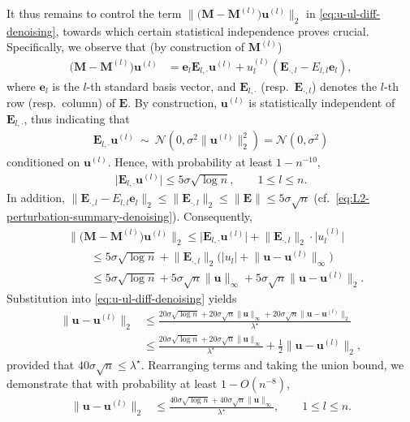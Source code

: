 It thus remains to control the term $\|\big(\bm{M}-\bm{M}^{(l)}\big)\bm{u}^{(l)}\|_{2}$ in \eqref{eq:u-ul-diff-denoising}, towards which certain statistical independence proves crucial. Specifically, we observe that (by construction of $\bm{M}^{(l)}$)
%
\begin{align*}
\big(\bm{M}-\bm{M}^{(l)}\big)\bm{u}^{(l)} & =\bm{e}_{l}\bm{E}_{l,\cdot}\bm{u}^{(l)}+u_{l}^{(l)}(\bm{E}_{\cdot,l} - E_{l,l}\bm{e}_{l}),
\end{align*}
%
where $\bm{e}_{l}$ is the $l$-th standard basis vector,
and $\bm{E}_{l,\cdot}$ (resp.~$\bm{E}_{\cdot,l}$)
denotes the $l$-th row (resp.~column) of $\bm{E}$. By construction, $\bm{u}^{(l)}$ is statistically independent of $\bm{E}_{l,\cdot}$, thus indicating that
%
\begin{align}
	\bm{E}_{l,\cdot} \bm{u}^{(l)} ~\sim~ \mathcal{N}(0, \sigma^2 \|\bm{u}^{(l)}\|_2^2) = \mathcal{N}(0, \sigma^2 )
\end{align}
%
conditioned on $\bm{u}^{(l)}$. Hence, with probability at least $1-n^{-10}$,
%
\begin{align}
	\big| \bm{E}_{l,\cdot} \bm{u}^{(l)} \big| \leq 5\sigma \sqrt{\log n}, \qquad 1\leq l\leq n.
\end{align}
%
In addition, $\|\bm{E}_{\cdot,l} - E_{l,l}\bm{e}_{l}\|_{2} \leq \|\bm{E}_{\cdot,l}\|_2\leq \|\bm{E}\|\leq 5\sigma \sqrt{n}$ (cf.~\eqref{eq:L2-perturbation-summary-denoising}). Consequently,
%
\begin{align*}
 & \|\big(\bm{M}-\bm{M}^{(l)}\big)\bm{u}^{(l)}\|_{2}
	\leq \big|\bm{E}_{l,\cdot}\bm{u}^{(l)}\big|  +
	 \big\|\bm{E}_{\cdot,l}\big\|_{2} \cdot \big|u_{l}^{(l)}\big| \\
 & \qquad \leq5\sigma\sqrt{\log n}+\big\|\bm{E}_{\cdot,l}\big\|_{2}\big(\big|u_{l}\big|+\big\|\bm{u}-\bm{u}^{(l)}\big\|_{\infty}\big)\\
 & \qquad \leq5\sigma\sqrt{\log n}+5\sigma\sqrt{n}\|\bm{u}\|_{\infty}+5\sigma\sqrt{n}\big\|\bm{u}-\bm{u}^{(l)}\big\|_{2}.
\end{align*}
%
Substitution into \eqref{eq:u-ul-diff-denoising} yields
%
\begin{align*}
\big\|\bm{u}-\bm{u}^{(l)}\big\|_{2}
 & \leq \frac{20\sigma\sqrt{\log n}+20\sigma\sqrt{n}\|\bm{u}\|_{\infty}+20\sigma\sqrt{n}\big\|\bm{u}-\bm{u}^{(l)}\big\|_{2}}{\lambda^{\star}}\\
 & \leq\frac{20\sigma\sqrt{\log n}+20\sigma\sqrt{n}\|\bm{u}\|_{\infty}}{\lambda^{\star}}+\frac{1}{2}\big\|\bm{u}-\bm{u}^{(l)}\big\|_{2},
\end{align*}
%
provided that $40\sigma\sqrt{n}\leq \lambda^{\star}$.
Rearranging terms and taking the union bound, we demonstrate that with probability at least $1- O(n^{-8})$,
%
\begin{align}
\big\|\bm{u}-\bm{u}^{(l)}\big\|_{2} & \leq\frac{40\sigma\sqrt{\log n}+40\sigma\sqrt{n}\|\bm{u}\|_{\infty}}{\lambda^{\star}} , \qquad 1\leq l\leq n.
	\label{eq:u-ul-proximity-final-denoising}
\end{align}
%

